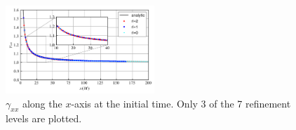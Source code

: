 \documentclass[%
 reprint,
 amsmath,amssymb,
 aps,
 prd,
]{revtex4-2}
\begin{document}
\begin{figure}[h]
	\includegraphics[width=0.5\textwidth]{data/gammaxx.png}%
	\caption{\label{fig:gammaxx} $\gamma_{xx}$ along the $x$-axis at the initial time. Only 3 of the 7 refinement levels are plotted.}
\end{figure}

%
%
%
%
\end{document}
